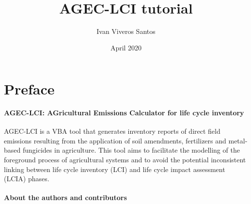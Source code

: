 \documentclass[openany]{book}
\title{AGEC-LCI tutorial}
\author{Ivan Viveros Santos}
\date{April 2020}
\begin{document}
\maketitle

{
\setcounter{tocdepth}{1}
\tableofcontents
}
\hypertarget{preface}{%
\chapter*{Preface}\label{preface}}

\hypertarget{agec-lci-agricultural-emissions-calculator-for-life-cycle-inventory}{%
\subsubsection*{AGEC-LCI: AGricultural Emissions Calculator for life cycle inventory}\label{agec-lci-agricultural-emissions-calculator-for-life-cycle-inventory}}

AGEC-LCI is a VBA tool that generates inventory reports of direct field emissions resulting from the application of soil amendments, fertilizers and metal-based fungicides in agriculture. This tool aims to facilitate the modelling of the foreground process of agricultural systems and to avoid the potential inconsistent linking between life cycle inventory (LCI) and life cycle impact assessment (LCIA) phases.

\hypertarget{about-the-authors-and-contributors}{%
\subsubsection*{About the authors and contributors}\label{about-the-authors-and-contributors}}
\end{document}
